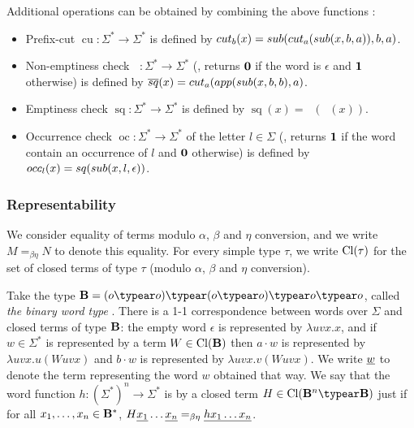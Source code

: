 Additional operations can be obtained by combining the above functions \cite{DBLP:journals/apal/Zaionc91}:
\begin{itemize}
    \item Prefix-cut $\mathop{cut_b} : \Sigma^* \rightarrow
\Sigma^*$ is defined by $\mathop{cut_b}(x) = \mathop{sub}(\mathop{cut_a}(\mathop{sub}(x,b,a)),b,a)$.

  \item Non-emptiness check $\mathop{\overline{sq}} : \Sigma^* \rightarrow \Sigma^*$ (\ie, returns $\mathbf{0}$ if the word is $\epsilon$ and $\mathbf{1}$ otherwise) is defined by $\mathop{\overline{sq}}(x) = \mathop{cut_a}(\mathop{app}(\mathop{sub}(x,b,b),a)$.
  
  \item Emptiness check $\mathop{sq} : \Sigma^* \rightarrow \Sigma^*$ is defined by
    $\mathop{sq}(x) = \mathop{\overline{sq}}(\mathop{\overline{sq}}(x))$.
  
  \item Occurrence check $\mathop{occ_l} : \Sigma^* \rightarrow \Sigma^*$ of the letter $l\in\Sigma$ (\ie, returns $\mathbf{1}$ if the word contain an occurrence of $l$ and $\mathbf{0}$ otherwise) is defined by
      $\mathop{occ_l}(x) = \mathop{sq}(\mathop{sub}(x,l,\epsilon))$.
\end{itemize}

\subsubsection*{Representability}
We consider equality of terms modulo $\alpha$,
$\beta$ and $\eta$ conversion, and we write $M=_{\beta\eta} N$ to
denote this equality. For every simple type $\tau$, we write
${\rm Cl}(\tau)$ for the set of closed terms of type $\tau$ (modulo
$\alpha$, $\beta$ and $\eta$ conversion).

Take the type $\zaiwordtyp = (o\typear o)\typear (o\typear o)\typear
o\typear o$, called \emph{the binary word type}
\cite{DBLP:journals/tcs/Zaionc87}. There is a 1-1 correspondence
between words over $\Sigma$ and closed terms of type $\mathbf{B}$:
the empty word $\epsilon$ is represented by $\lambda u v x.x$, and
if $w\in \Sigma^*$ is represented by a term $W \in
{\rm Cl}(\mathbf{B})$ then $a \cdot w$ is represented by $\lambda
u v x. u(W uvx)$ and $b \cdot w$ is represented by $\lambda u v x.
v(W uvx)$. We write $\underline{w}$ to denote the term representing the word $w$ obtained that way. We say that the
word function $h:(\Sigma^*)^n \rightarrow \Sigma^*$ is
 by a closed term $H \in \closedof{\zaiwordtyp^n
\typear \zaiwordtyp}$ just if for all $x_1, \ldots, x_n \in
\mathbf{B}^*$, $H \underline{x_1} \ldots \underline{x_n} =_{\beta\eta}
\underline{h x_1 \ldots x_n}$.


